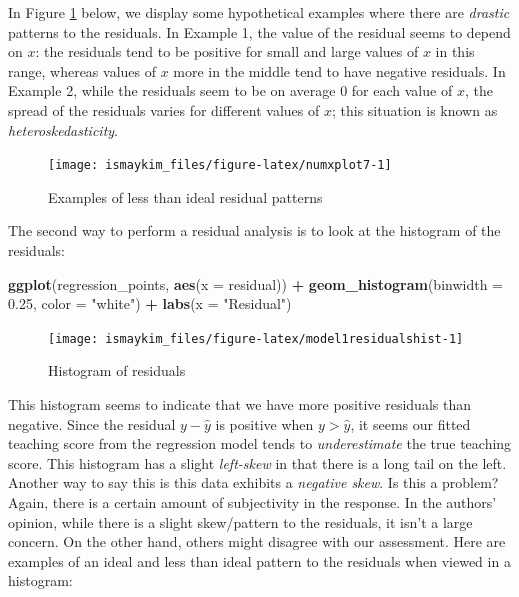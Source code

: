 \documentclass[12pt, krantz2,]{krantz}
\makeatletter
\newenvironment{Shaded}{\begin{snugshade}}{\end{snugshade}}
\newcommand{\DataTypeTok}[1]{\textcolor[rgb]{0.27,0.27,0.27}{#1}}
\newcommand{\FloatTok}[1]{\textcolor[rgb]{0.06,0.06,0.06}{#1}}
\newcommand{\KeywordTok}[1]{\textcolor[rgb]{0.27,0.27,0.27}{\textbf{#1}}}
\newcommand{\NormalTok}[1]{#1}
\newcommand{\OperatorTok}[1]{\textcolor[rgb]{0.43,0.43,0.43}{\textbf{#1}}}
\newcommand{\StringTok}[1]{\textcolor[rgb]{0.5,0.5,0.5}{#1}}
\newenvironment{kframe}{%
\medskip{}
\setlength{\fboxsep}{.8em}
 \def\at@end@of@kframe{}%
 \ifinner\ifhmode%
  \def\at@end@of@kframe{\end{minipage}}%
  \begin{minipage}{\columnwidth}%
 \fi\fi%
 \def\FrameCommand##1{\hskip\@totalleftmargin \hskip-\fboxsep
 \colorbox{shadecolor}{##1}\hskip-\fboxsep
     \hskip-\linewidth \hskip-\@totalleftmargin \hskip\columnwidth}%
 \MakeFramed {\advance\hsize-\width
   \@totalleftmargin\z@ \linewidth\hsize
   \@setminipage}}%
 {\par\unskip\endMakeFramed%
 \at@end@of@kframe}
\renewenvironment{Shaded}{\begin{kframe}}{\end{kframe}}
\makeatother
\begin{document}
In Figure \ref{fig:numxplot7} below, we display some hypothetical examples where there are \emph{drastic} patterns to the residuals. In Example 1, the value of the residual seems to depend on \(x\): the residuals tend to be positive for small and large values of \(x\) in this range, whereas values of \(x\) more in the middle tend to have negative residuals. In Example 2, while the residuals seem to be on average 0 for each value of \(x\), the spread of the residuals varies for different values of \(x\); this situation is known as \emph{heteroskedasticity}.

\begin{figure}

{\centering \texttt{[image: ismaykim\_files/figure-latex/numxplot7-1]} 

}

\caption{Examples of less than ideal residual patterns}\label{fig:numxplot7}
\end{figure}

The second way to perform a residual analysis is to look at the histogram of the residuals:

\begin{Shaded}
\begin{Highlighting}[]
\KeywordTok{ggplot}\NormalTok{(regression_points, }\KeywordTok{aes}\NormalTok{(}\DataTypeTok{x =}\NormalTok{ residual)) }\OperatorTok{+}
\StringTok{  }\KeywordTok{geom_histogram}\NormalTok{(}\DataTypeTok{binwidth =} \FloatTok{0.25}\NormalTok{, }\DataTypeTok{color =} \StringTok{"white"}\NormalTok{) }\OperatorTok{+}
\StringTok{  }\KeywordTok{labs}\NormalTok{(}\DataTypeTok{x =} \StringTok{"Residual"}\NormalTok{)}
\end{Highlighting}
\end{Shaded}

\begin{figure}

{\centering \texttt{[image: ismaykim\_files/figure-latex/model1residualshist-1]} 

}

\caption{Histogram of residuals}\label{fig:model1residualshist}
\end{figure}

This histogram seems to indicate that we have more positive residuals than negative. Since the residual \(y-\widehat{y}\) is positive when \(y > \widehat{y}\), it seems our fitted teaching score from the regression model tends to \emph{underestimate} the true teaching score. This histogram has a slight \emph{left-skew} in that there is a long tail on the left. Another way to say this is this data exhibits a \emph{negative skew}. Is this a problem? Again, there is a certain amount of subjectivity in the response. In the authors' opinion, while there is a slight skew/pattern to the residuals, it isn't a large concern. On the other hand, others might disagree with our assessment. Here are examples of an ideal and less than ideal pattern to the residuals when viewed in a histogram:
\end{document}
